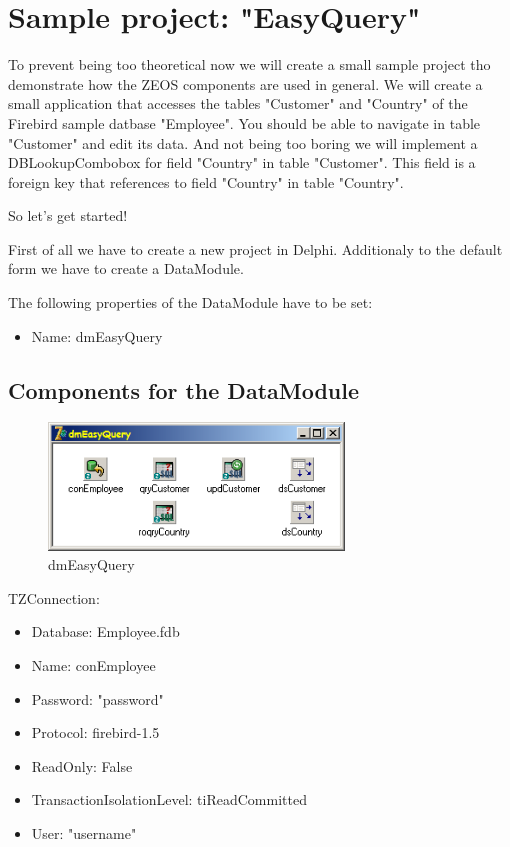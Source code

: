 \documentclass[a4paper,12pt,oneside]{book}
\begin{document}
\chapter{Sample project: "EasyQuery"}
To prevent being too theoretical now we will create a small sample project tho demonstrate how the ZEOS components are used in general.
We will create a small application that accesses the tables "Customer" and "Country" of the Firebird sample datbase "Employee".
You should be able to navigate in table "Customer" and edit its data.
And not being too boring we will implement a DBLookupCombobox for field "Country" in table "Customer".
This field is a foreign key that references to field "Country" in table "Country".

So let's get started!

First of all we have to create a new project in Delphi.
Additionaly to the default form we have to create a DataModule.

The following properties of the DataModule have to be set:
\begin{itemize}
\item Name: dmEasyQuery
\end{itemize}

\section{Components for the DataModule}
\begin{figure}[htbp] 
  \centering
  \includegraphics[width=0.7\textwidth]{ZeosTutorial/dmEasyQuery.png}
  \caption{dmEasyQuery}
  \label{fig:dmEasyQuery}
\end{figure}

TZConnection:
\begin{itemize}
  \item Database: Employee.fdb
  \item Name: conEmployee
  \item Password: "password"
  \item Protocol: firebird-1.5
  \item ReadOnly: False
  \item TransactionIsolationLevel: tiReadCommitted
  \item User: "username"
\end{itemize}
\end{document}
